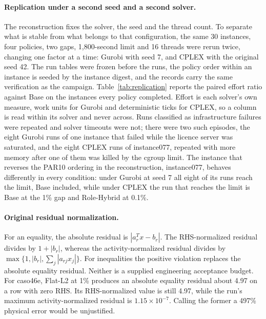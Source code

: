 \documentclass[11pt]{article}
\begin{document}
\paragraph{Replication under a second seed and a second solver.}
The reconstruction fixes the solver, the seed and the thread count. To separate what is stable
from what belongs to that configuration, the same 30 instances, four policies, two gaps,
1,800-second limit and 16 threads were rerun twice, changing one factor at a time: Gurobi with
seed 7, and CPLEX with the original seed 42. The run tables were frozen before the runs, the
policy order within an instance is seeded by the instance digest, and the records carry the same
verification as the campaign. Table~\ref{tab:replication} reports the paired effort ratio
against Base on the instances every policy completed. Effort is each solver's own measure, work
units for Gurobi and deterministic ticks for CPLEX, so a column is read within its solver and
never across. Runs classified as infrastructure failures were repeated and solver timeouts were not; there were two such
episodes, the eight Gurobi runs of one instance that failed while the licence server was
saturated, and the eight CPLEX runs of instance077, repeated with more memory after one of them
was killed by the cgroup limit. The instance that reverses the PAR10 ordering in the reconstruction,
instance077, behaves differently in every condition: under Gurobi at seed 7 all
eight of its runs reach the limit, Base included, while under CPLEX the run that reaches the
limit is Base at the 1\% gap and Role-Hybrid at 0.1\%.

\begin{table}[tb]
\centering\small
\caption{Paired effort ratio against Base on the instances completed by every policy, with
bootstrap intervals, for the reconstruction and its two replications. Values below one favour
the scaled policy.}
\label{tab:replication}

\end{table}

\paragraph{Original residual normalization.}
For an equality, the absolute residual is $|a_r^Tx-b_r|$. The RHS-normalized
residual divides by $1+|b_r|$, whereas the activity-normalized residual divides by
$\max\{1,|b_r|,\sum_j|a_{rj}x_j|\}$. For inequalities the positive violation replaces the
absolute equality residual. Neither is a supplied engineering acceptance budget.
For caso46e, Flat-L2 at 1\% produces an absolute equality residual about 4.97 on
a row with zero RHS. Its RHS-normalized value is still 4.97, while the run's maximum
activity-normalized residual is $1.15\times10^{-7}$. Calling the former a 497\%
physical error would be unjustified.
\end{document}

